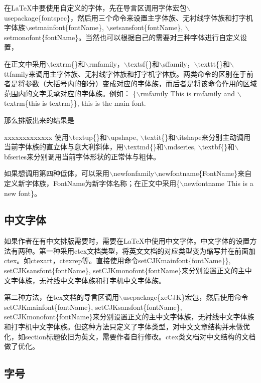 \documentclass[cn,10pt,math=newtx,citestyle=gb7714-2015,bibstyle=gb7714-2015]{elegantbook}
\begin{document}
在LaTeX中要使用自定义的字体，先在导言区调用字体宏包$\backslash$usepackage\{fontspec\}，然后用三个命令来设置主字体族、无衬线字体族和打字机字体族$\backslash$setmainfont\{fontName\}, $\backslash$setsansfont\{fontName\}, $\backslash$setmonofont\{fontName\}。当然也可以根据自己的需要对三种字体进行自定义设置，


在正文中采用$\backslash$textrm\{\}和$\backslash$rmfamily，$\backslash$textsf\{\}和$\backslash$sffamily，$\backslash$texttt\{\}和$\backslash$ttfamily来调用主字体族、无衬线字体族和打字机字体族。两类命令的区别在于前者是将参数（大括号内的部分）变成对应的字体族，而后者是将该命令作用的区域范围内的文字秉承对应的字体族。例如：
\{$\backslash$rmfamily This is rmfamily and $\backslash$textrm\{this is textrm\}\}, this is the main font.

那么排版出来的结果是

xxxxxxxxxxxxx
使用$\backslash$textup\{\}和$\backslash$upshape, $\backslash$textit\{\}和$\backslash$itshape来分别主动调用当前字体族的直立体与意大利斜体，用$\backslash$textmd\{\}和$\backslash$mdseries, $\backslash$textbf\{\}和$\backslash$bfseries来分别调用当前字体形状的正常体与粗体。

如果想调用第四种低体，可以采用$\backslash$newfonfamily$\backslash$newfontname\{FontName\}来自定义新字体族，FontName为新字体名称；在正文中采用\{$\backslash$newfontname This is a new font\}。

\subsection{中文字体}

如果作者在有中文排版需要时，需要在\LaTeX{}中使用中文字体。中文字体的设置方法有两种。第一种采用ctex文档类型，将英文文档的对应类型变为缩写并在前面加ctex。如ctexart，ctexrep等。直接使用命令setCJKmainfont\{fontName\}\}, setCJKsansfont\{fontName\}, setCJKmonofont\{fontName\}来分别设置正文的主中文字体族，无衬线中文字体族和打字机中文字体族。

第二种方法，在tex文档的导言区调用$\backslash$usepackage\{xeCJK\}宏包，然后使用命令setCJKmainfont\{fontName\}, setCJKsansfont\{fontName\}, setCJKmonofont\{fontName\}来分别设置正文的主中文字体族，无衬线中文字体族和打字机中文字体族。但这种方法只定义了字体类型，对中文文章结构并未做优化，如section标题依旧为英文，需要作者自行修改。ctex类文档对中文结构的文档做了优化。

\subsection{字号}
\end{document}
